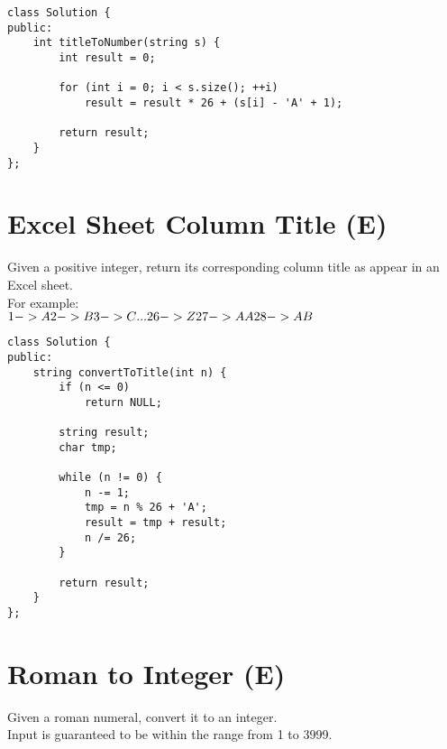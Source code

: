 \begin{lstlisting}
class Solution {
public:
    int titleToNumber(string s) {
        int result = 0;
        
        for (int i = 0; i < s.size(); ++i)
            result = result * 26 + (s[i] - 'A' + 1);
            
        return result;
    }
};
\end{lstlisting}


\section{Excel Sheet Column Title (E)}
Given a positive integer, return its corresponding column title as appear in an Excel sheet.\\

For example:\\
$
    1 -> A\\
    2 -> B\\
    3 -> C\\
    ...\\
    26 -> Z\\
    27 -> AA\\
    28 -> AB \\$
    
\begin{lstlisting}
class Solution {
public:
    string convertToTitle(int n) {
        if (n <= 0)
            return NULL;
            
        string result;
        char tmp;
        
        while (n != 0) {
            n -= 1;
            tmp = n % 26 + 'A';
            result = tmp + result;            
            n /= 26;
        }
        
        return result;
    }
};
\end{lstlisting}   


\section{Roman to Integer (E)}
Given a roman numeral, convert it to an integer.\\

Input is guaranteed to be within the range from 1 to 3999.\\

